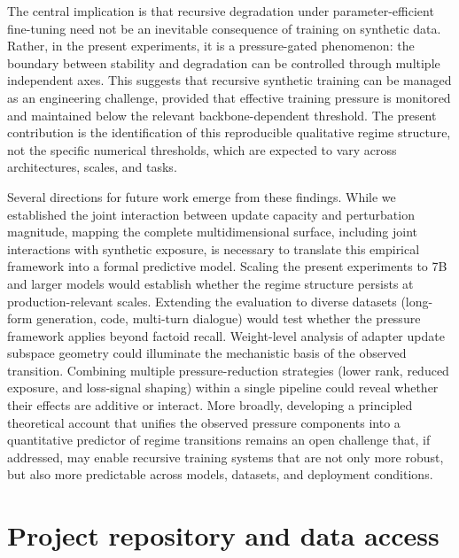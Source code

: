 \documentclass[a4paper,fleqn]{cas-dc}
\begin{document}
The central implication is that recursive degradation under parameter-efficient
fine-tuning need not be an inevitable consequence of training on synthetic data.
Rather, in the present experiments, it is a pressure-gated phenomenon: the
boundary between stability and degradation can be controlled through multiple
independent axes. This suggests that recursive synthetic training can be
managed as an engineering challenge, provided that effective training pressure
is monitored and maintained below the relevant backbone-dependent threshold. The
present contribution is the identification of this reproducible
qualitative regime structure, not the specific numerical thresholds, which are
expected to vary across architectures, scales, and tasks.

Several directions for future work emerge from these findings. While we
established the joint interaction between update capacity and
perturbation magnitude, mapping the complete multidimensional
surface, including joint interactions with synthetic exposure, is necessary to
translate this empirical framework into a formal predictive model. Scaling the
present experiments to 7B and larger models would establish whether the regime
structure persists at production-relevant scales. Extending the evaluation to
diverse datasets (long-form generation, code, multi-turn dialogue) would test
whether the pressure framework applies beyond factoid recall. Weight-level
analysis of adapter update subspace geometry could illuminate the mechanistic
basis of the observed transition. Combining multiple pressure-reduction
strategies (lower rank, reduced exposure, and loss-signal shaping) within a
single pipeline could reveal whether their effects are additive or interact.
More broadly, developing a principled theoretical account that unifies the
observed pressure components into a quantitative predictor of regime transitions
remains an open challenge that, if addressed, may enable recursive training
systems that are not only more robust, but also more predictable across models,
datasets, and deployment conditions.

\printcredits

\appendix

\section{Project repository and data access}\label{app:repo}
\end{document}

